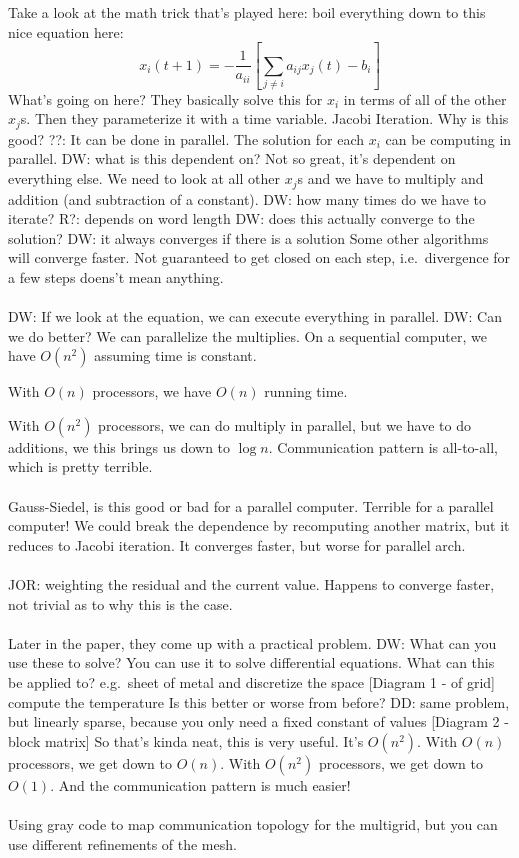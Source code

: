 Take a look at the math trick that's played here:
boil everything down to this nice equation here:
\[
x_{i}(t + 1) = -\frac{1}{a_{ii}} [ \sum_{j \neq i} a_{ij} x_{j} (t) - b_{i} ]
\]
What's going on here?
They basically solve this for \( x_{i} \) in terms of all of the other \( x_{j} \)s.
Then they parameterize it with a time variable.
Jacobi Iteration.
Why is this good?
??: It can be done in parallel. The solution for each \( x_{i} \) can be computing in parallel.
DW: what is this dependent on?
Not so great, it's dependent on everything else.
We need to look at all other \( x_{j} \)s and we have to multiply and addition (and subtraction of a constant).
DW: how many times do we have to iterate?
R?: depends on word length
DW: does this actually converge to the solution?
DW: it always converges if there is a solution
Some other algorithms will converge faster.
Not guaranteed to get closed on each step, i.e.\ divergence for a few steps doens't mean anything.
\\ \\
DW: If we look at the equation, we can execute everything in parallel.
DW: Can we do better?
We can parallelize the multiplies.
On a sequential computer, we have \( O (n^2) \) assuming time is constant.

With \( O(n) \) processors, we have \( O(n) \) running time.

With \( O(n^2) \) processors, we can do multiply in parallel, but we have to do additions, we this brings us down to \( \log{n} \).
Communication pattern is all-to-all, which is pretty terrible.
\\ \\
Gauss-Siedel, is this good or bad for a parallel computer.
Terrible for a parallel computer!
We could break the dependence by recomputing another matrix, but it reduces to Jacobi iteration.
It converges faster, but worse for parallel arch.
\\ \\
JOR: weighting the residual and the current value.
Happens to converge faster, not trivial as to why this is the case.
\\ \\
Later in the paper, they come up with a practical problem.
DW: What can you use these to solve?
You can use it to solve differential equations.
What can this be applied to?
e.g.\ sheet of metal and discretize the space [Diagram 1 - of grid]
compute the temperature
Is this better or worse from before?
DD: same problem, but linearly sparse, because you only need a fixed constant of values [Diagram 2 - block matrix]
So that's kinda neat, this is very useful.
It's \( O(n^2) \).
With \( O(n) \) processors, we get down to \( O(n) \).
With \( O(n^2) \) processors, we get down to \( O(1) \).
And the communication pattern is much easier!
\\ \\
Using gray code to map communication topology for the multigrid, but you can use different refinements of the mesh.

